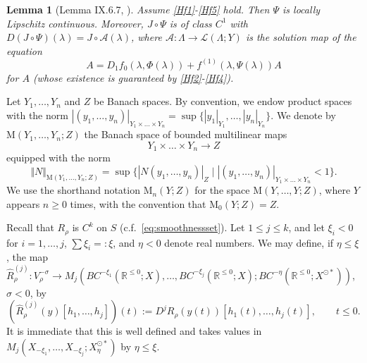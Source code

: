 \documentclass[a4paper, 12pt, oneside, reqno, notitlepage]{amsart}
\theoremstyle{plain}
\newtheorem{lemma}[theorem]{Lemma}
\theoremstyle{definition}
\theoremstyle{remark}
\begin{document}
\begin{lemma}[Lemma IX.6.7, \cite{diekmann2012delay}] \label{lemma:6.7}
    Assume \ref{Hf1}-\ref{Hf5} hold.
    Then $\Psi$ is locally Lipschitz continuous.
    Moreover, $J \circ \Psi$ is of class $C^1$ with $D( J \circ \Psi)(\lambda) = J \circ \mathcal{A}(\lambda)$, where $\mathcal{A}: \Lambda \to \mathcal{L}(\Lambda;Y)$ is the solution map of the equation 
    \begin{displaymath}
        A =  D_1f_0(\lambda,\Phi(\lambda)) + f^{(1)} (\lambda,\Psi(\lambda)) A 
    \end{displaymath}
    for $A$ (whose existence is guaranteed by \ref{Hf2}-\ref{Hf4}).
\end{lemma}




Let $Y_1,\ldots , Y_n$ and $Z$ be Banach spaces.  
By convention, we endow product spaces with the norm $|(y_1,\ldots,y_n)|_{Y_1 \times \ldots \times Y_n} = \sup \{|y_1|_{Y_1},\ldots,|y_n|_{Y_n}\}$.
We denote by $\mathrm{M}(Y_1,\ldots,Y_n;Z)$ the Banach space of bounded multilinear maps 
\begin{displaymath}
    Y_1 \times \ldots \times Y_n \longrightarrow Z
\end{displaymath}
equipped with the norm 
\begin{displaymath}
    \Vert N \Vert_{\mathrm{M}(Y_1,\ldots,Y_n;Z)} = \sup \big\{ | N(y_1, \ldots, y_n) |_Z \; \big| \; |(y_1, \ldots, y_n)|_{Y_1 \times \ldots \times Y_n} < 1 \big\}.
\end{displaymath}
We use the shorthand notation $\mathrm{M}_n(Y;Z)$ for the space $\mathrm{M}(Y,\ldots,Y;Z)$, where $Y$ appears $n \geq 0$ times, with the convention that $\mathrm{M}_0(Y;Z) = Z$.


Recall that $R_\rho$ is $C^k$ on $S$ (c.f.\ \eqref{eq:smoothnessset}).
Let $1 \leq j \leq k$, and  let $\xi_i < 0$ for $i =1,\ldots,j$, $\sum \xi_i = : \xi$, and $\eta < 0 $ denote real numbers.
We may define, if $\eta \leq \xi$, the map  $\widehat{R}_\rho^{(j)}: V^{-\sigma}_\rho \to M_j(BC^{-\xi_1}(\mathbb{R}^{\leq 0};X),\ldots,BC^{-\xi_j}(\mathbb{R}^{\leq 0};X);BC^{-\eta}(\mathbb{R}^{\leq 0};X^{\odot *}))$, $\sigma < 0$, by 
\begin{equation}
    \left( \widehat{R}_\rho^{(j)}(y)[h_1,\ldots,h_j] \right) (t):= D^jR_\rho(y(t))[h_1(t),\ldots,h_j(t)], \qquad t \leq 0.
    \label{eq:widehatR(j)}
\end{equation}
It is immediate that this is well defined and takes values in $M_j(X_{-\xi_1},\ldots,X_{-\xi_j};X^{\odot *}_{\eta})$ by $\eta \leq  \xi$.
\end{document}
